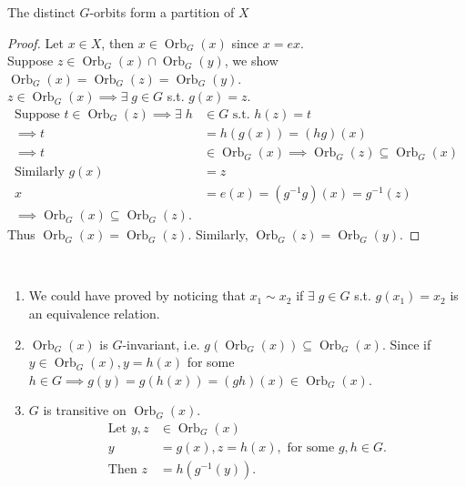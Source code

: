 \begin{lemma} \label{lem:17}
    The distinct $G$-orbits form a partition of $X$
\end{lemma} 

\begin{proof}
    Let $x \in X$, then $x \in \operatorname{Orb}_G(x)$ since $x = ex$. \\
    Suppose $z \in \operatorname{Orb}_G(x) \cap \operatorname{Orb}_G(y)$, we show $\operatorname{Orb}_G(x) = \operatorname{Orb}_G(z) = \operatorname{Orb}_G(y)$. \\
    $z \in \operatorname{Orb}_G(x) \implies \exists \; g \in G$ s.t. $g(x) = z$.
    \begin{align*}
        \text{Suppose } t \in \operatorname{Orb}_G(z) \implies \exists \; h &\in G \text{ s.t. } h(z) = t \\
        \implies t &= h(g(x)) = (hg)(x) \\
        \implies t &\in \operatorname{Orb}_G(x)
        \implies \operatorname{Orb}_G(z) \subseteq \operatorname{Orb}_G(x) \\
        \text{Similarly } g(x) &= z \\
        x &= e(x) = (g^{-1} g)(x) = g^{-1}(z) \\
        \implies \operatorname{Orb}_G(x) \subseteq \operatorname{Orb}_G(z).
    \end{align*} 
    Thus $\operatorname{Orb}_G(x) = \operatorname{Orb}_G(z)$.
    Similarly, $\operatorname{Orb}_G(z) = \operatorname{Orb}_G(y)$.
\end{proof} 

\begin{remark} ~
    \begin{enumerate}
        \item We could have proved  by noticing that $x_1 \sim x_2$ if $\exists \; g \in G$ s.t. $g(x_1) = x_2$ is an equivalence relation.
        \item $\operatorname{Orb}_G(x)$ is $G$-invariant, i.e. $g \left( \operatorname{Orb}_G(x) \right) \subseteq \operatorname{Orb}_G(x)$.
        Since if $y \in \operatorname{Orb}_G(x), y = h(x)$ for some $h \in G \implies g(y) = g(h(x)) = (gh)(x) \in \operatorname{Orb}_G(x)$.
        \item $G$ is transitive on $\operatorname{Orb}_G(x)$.
        \begin{align*}
            \text{Let } y, z &\in \operatorname{Orb}_G(x) \\
            y &= g(x), z = h(x), \text{ for some } g, h \in G. \\
            \text{Then } z &= h(g^{-1}(y)).
        \end{align*} 
    \end{enumerate} 
\end{remark} 

